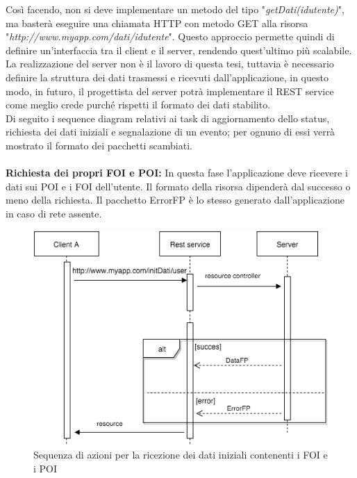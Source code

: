Così facendo, non si deve implementare un metodo del tipo "\textit{getDati(idutente)}", ma basterà eseguire una chiamata HTTP con metodo GET alla risorsa \\
"\textit{http://www.myapp.com/dati/idutente}". Questo approccio permette quindi di definire un'interfaccia tra il client e il server, rendendo quest'ultimo più scalabile. 
La realizzazione del server non è il lavoro di questa tesi, tuttavia è necessario definire la struttura dei dati trasmessi e ricevuti dall'applicazione, in questo modo, in futuro, il progettista del server potrà implementare il REST service come meglio crede purché rispetti il formato dei dati stabilito. \\
Di seguito i sequence diagram relativi ai task di aggiornamento dello status, richiesta dei dati iniziali e segnalazione di un evento; per ognuno di essi verrà mostrato il formato dei pacchetti scambiati.\\\\
 \textbf{Richiesta dei propri FOI e POI:} In questa fase l'applicazione deve ricevere i dati sui POI e i FOI dell'utente. Il formato della risorsa dipenderà dal successo o meno della richiesta. Il pacchetto ErrorFP è lo stesso generato dall'applicazione in caso di rete assente. \\
 \begin{figure}[H]
	\centering
	\includegraphics[scale=0.7]{Implementazione/foipois.png}
	\caption{Sequenza di azioni per la ricezione dei dati iniziali contenenti i FOI e i POI}
	\label{fig:rest}
\end{figure}
